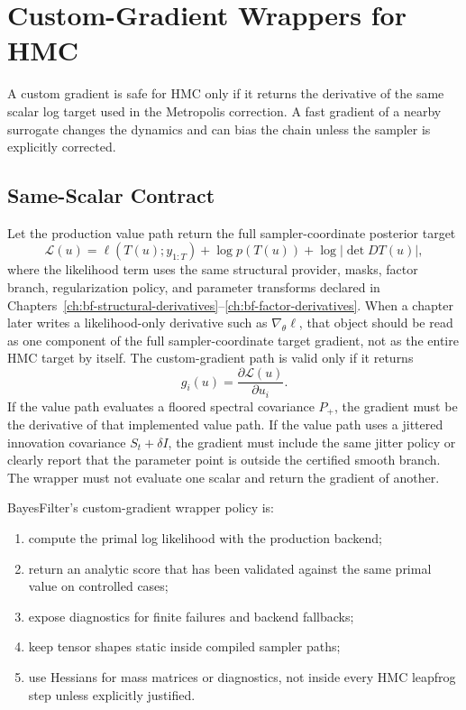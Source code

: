 \chapter{Custom-Gradient Wrappers for HMC}
\label{ch:bf-custom-gradient-wrappers}

A custom gradient is safe for HMC only if it returns the derivative of the same
scalar log target used in the Metropolis correction.  A fast gradient of a
nearby surrogate changes the dynamics and can bias the chain unless the sampler
is explicitly corrected.

\section{Same-Scalar Contract}
\label{sec:bf-custom-gradient-same-scalar}

Let the production value path return the full sampler-coordinate posterior target
\begin{equation}
\label{eq:bf-custom-primal-target}
  \mathcal{L}(u)
  =
  \ell(T(u);y_{1:T})
  + \log p(T(u))
  + \log\left|\det DT(u)\right|,
\end{equation}
where the likelihood term uses the same structural provider, masks, factor
branch, regularization policy, and parameter transforms declared in
Chapters~\ref{ch:bf-structural-derivatives}--\ref{ch:bf-factor-derivatives}.
When a chapter later writes a likelihood-only derivative such as
\(\nabla_\theta \ell\), that object should be read as one component of the full
sampler-coordinate target gradient, not as the entire HMC target by itself.  The
custom-gradient path is valid only if it returns
\begin{equation}
\label{eq:bf-custom-gradient-target}
  g_i(u)=\frac{\partial \mathcal{L}(u)}{\partial u_i}.
\end{equation}
If the value path evaluates a floored spectral covariance $P_+$, the gradient
must be the derivative of that implemented value path.  If the value path uses a
jittered innovation covariance $S_t+\delta I$, the gradient must include the
same jitter policy or clearly report that the parameter point is outside the
certified smooth branch.  The wrapper must not evaluate one scalar and return the
gradient of another.

BayesFilter's custom-gradient wrapper policy is:
\begin{enumerate}[label=(\roman*)]
  \item compute the primal log likelihood with the production backend;
  \item return an analytic score that has been validated against the same
    primal value on controlled cases;
  \item expose diagnostics for finite failures and backend fallbacks;
  \item keep tensor shapes static inside compiled sampler paths;
  \item use Hessians for mass matrices or diagnostics, not inside every HMC
    leapfrog step unless explicitly justified.
\end{enumerate}

